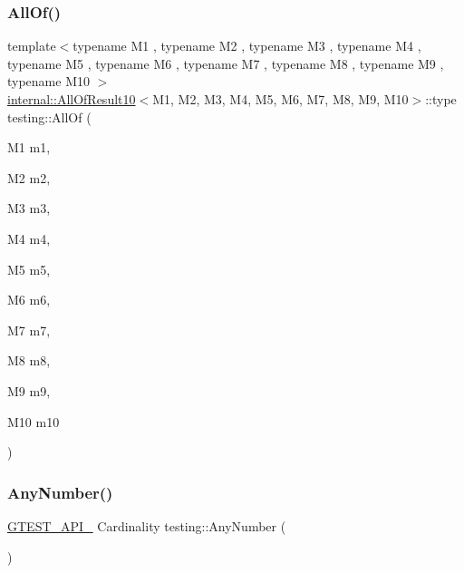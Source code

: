 \mbox{\label{namespacetesting_a9939c08664efeed0c1983090115f7ecb}} 
\subsubsection{\texorpdfstring{AllOf()}{AllOf()}\hspace{0.1cm}{\footnotesize\ttfamily [9/9]}}
{\footnotesize\ttfamily template$<$typename M1 , typename M2 , typename M3 , typename M4 , typename M5 , typename M6 , typename M7 , typename M8 , typename M9 , typename M10 $>$ \\
\mbox{\hyperlink{structtesting_1_1internal_1_1_all_of_result10}{internal\+::\+All\+Of\+Result10}}$<$M1, M2, M3, M4, M5, M6, M7, M8, M9, M10$>$\+::type testing\+::\+All\+Of (\begin{DoxyParamCaption}\item[{M1}]{m1,  }\item[{M2}]{m2,  }\item[{M3}]{m3,  }\item[{M4}]{m4,  }\item[{M5}]{m5,  }\item[{M6}]{m6,  }\item[{M7}]{m7,  }\item[{M8}]{m8,  }\item[{M9}]{m9,  }\item[{M10}]{m10 }\end{DoxyParamCaption})\hspace{0.3cm}{\ttfamily [inline]}}

\mbox{\label{namespacetesting_aa1f8a6371097e1e9b8d6866020f35252}} 
\subsubsection{\texorpdfstring{AnyNumber()}{AnyNumber()}}
{\footnotesize\ttfamily \mbox{\hyperlink{_obj__test_2lib_2googletest-release-1_88_81_2googletest_2include_2gtest_2internal_2gtest-port_8h_aa73be6f0ba4a7456180a94904ce17790}{G\+T\+E\+S\+T\+\_\+\+A\+P\+I\+\_\+}} Cardinality testing\+::\+Any\+Number (\begin{DoxyParamCaption}{ }\end{DoxyParamCaption})}

\mbox{\label{namespacetesting_a81cfefd9f75cdce827d5bc873cf73aac}} 
